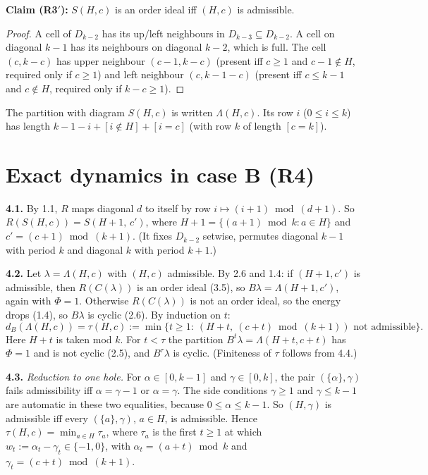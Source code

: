 \documentclass[11pt]{article}
\theoremstyle{remark}
\begin{document}
\textbf{Claim (R3$'$):} $S(H,c)$ is an order ideal iff $(H,c)$ is admissible.

\begin{proof}
A cell of $D_{k-2}$ has its up/left neighbours in $D_{k-3}\subseteq D_{k-2}$. A cell on diagonal $k-1$ has its
neighbours on diagonal $k-2$, which is full. The cell $(c,k-c)$ has upper neighbour $(c-1,k-c)$ (present iff
$c\ge1$ and $c-1\notin H$, required only if $c\ge 1$) and left neighbour $(c,k-1-c)$ (present iff $c\le k-1$ and
$c\notin H$, required only if $k-c\ge1$).
\end{proof}

The partition with diagram $S(H,c)$ is written $\Lambda(H,c)$. Its row $i$ ($0\le i\le k$) has length
$k-1-i+[i\notin H]+[i=c]$ (with row $k$ of length $[c=k]$).

\section{Exact dynamics in case B (R4)}

\textbf{4.1.} By 1.1, $R$ maps diagonal $d$ to itself by row $i\mapsto(i+1)\bmod(d+1)$. So
$R(S(H,c))=S(H+1,\,c')$, where $H+1=\{(a+1)\bmod k:a\in H\}$ and $c'=(c+1)\bmod(k+1)$. (It fixes $D_{k-2}$
setwise, permutes diagonal $k-1$ with period $k$ and diagonal $k$ with period $k+1$.)

\textbf{4.2.} Let $\lambda=\Lambda(H,c)$ with $(H,c)$ admissible. By 2.6 and 1.4: if $(H+1,c')$ is admissible, then
$R(C(\lambda))$ is an order ideal (3.5), so $B\lambda=\Lambda(H+1,c')$, again with $\Phi=1$. Otherwise
$R(C(\lambda))$ is not an order ideal, so the energy drops (1.4), so $B\lambda$ is cyclic (2.6). By induction on
$t$:
\[
d_B(\Lambda(H,c))=\tau(H,c):=\min\{t\ge1:\ (H+t,\ (c+t)\bmod(k+1))\text{ not admissible}\}.
\]
Here $H+t$ is taken mod $k$. For $t<\tau$ the partition $B^t\lambda=\Lambda(H+t,c+t)$ has $\Phi=1$ and is not
cyclic (2.5), and $B^{\tau}\lambda$ is cyclic. (Finiteness of $\tau$ follows from 4.4.)

\textbf{4.3.} \emph{Reduction to one hole.} For $\alpha\in[0,k-1]$ and $\gamma\in[0,k]$, the pair
$(\{\alpha\},\gamma)$ fails admissibility iff $\alpha=\gamma-1$ or $\alpha=\gamma$. The side conditions
$\gamma\ge1$ and $\gamma\le k-1$ are automatic in these two equalities, because $0\le\alpha\le k-1$. So
$(H,\gamma)$ is admissible iff every $(\{a\},\gamma)$, $a\in H$, is admissible. Hence
$\tau(H,c)=\min_{a\in H}\tau_a$, where $\tau_a$ is the first $t\ge1$ at which $w_t:=\alpha_t-\gamma_t\in\{-1,0\}$,
with $\alpha_t=(a+t)\bmod k$ and $\gamma_t=(c+t)\bmod(k+1)$.
\end{document}

